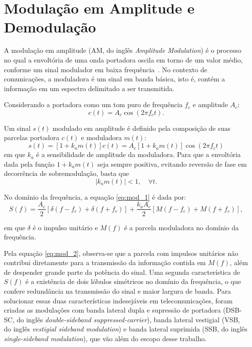 \section{Modulação em Amplitude e Demodulação}
A modulação em amplitude (AM, do inglês \textit{Amplitude Modulation}) é o
processo no qual a envoltória de uma onda portadora oscila em torno de um valor
médio, conforme um sinal modulador em baixa frequência~\cite{haykin2008}. No
contexto de comunicações, a moduladora é um sinal em banda básica, isto é,
contém a informação em um espectro delimitado a ser transmitida.

Considerando a portadora como um tom puro de frequência $f_c$ e amplitude $A_c$:
\begin{equation}
    c(t) = A_c \cos(2\pi f_c t).
\end{equation}

    Um sinal $s(t)$ modulado em amplitude é definido pela composição de
suas parcelas portadora $c(t)$ e moduladora $m(t)$:
\begin{equation}
    s(t) = [1+k_a m(t)]c(t) = A_c[1+k_a m(t)]\cos(2\pi f_c t) \label{eq:mod_1}
\end{equation}
em que $k_a$ é a sensibilidade de amplitude da moduladora. Para que a envoltória
dada pela função $1+k_a m(t)$ seja sempre positiva, evitando reversão de fase
em decorrência de sobremodulação, basta que
\begin{equation}
    |k_a m(t)| < 1, \quad \forall t.
\end{equation}

No domínio da frequência, a equação \eqref{eq:mod_1} é dada por:
\begin{equation}
    S(f) = \frac{A_c}{2} [\delta (f - f_c) + \delta(f + f_c)] + \frac{k_a A_c}{2} [M(f - f_c) + M (f + f_c)], \label{eq:mod_2}
\end{equation}

em que $\delta$ é o impulso unitário e $M(f)$ é a parcela moduladora no domínio
da frequência.

Pela equação \eqref{eq:mod_2}, observa-se que a parcela com impulsos unitários
não contribui diretamente para a transmissão da informação contida em $M(f)$,
além de despender grande parte da potência do sinal. Uma segunda característica
de $S(f)$ é a existência de dois lóbulos simétricos no domínio da frequência, o
que confere redundância na transmissão do sinal e maior largura de banda. Para
solucionar essas duas características indesejáveis em telecomunicações, foram
criadas as modulações com banda lateral dupla e supressão de portadora (DSB-SC,
do inglês \textit{double-sideband suppressed-carrier}), banda lateral vestigial
(VSB, do inglês \textit{vestigial sideband modulation}) e banda lateral
suprimida (SSB, do inglês \textit{single-sideband modulation}), que vão além do
escopo desse trabalho.

